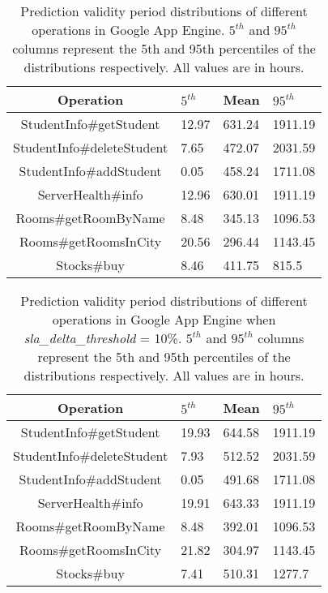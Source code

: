 \begin{table}
\begin{center}
\begin{tabular}{|c|p{1cm}|p{1cm}|p{1cm}|}
\hline
Operation & $5^{th}$ & Mean & $95^{th}$ \\ \hline
StudentInfo\#getStudent & 12.97 & 631.24 & 1911.19 \\ \hline
StudentInfo\#deleteStudent & 7.65 & 472.07 & 2031.59 \\ \hline
StudentInfo\#addStudent & 0.05 & 458.24 & 1711.08 \\ \hline
ServerHealth\#info & 12.96 & 630.01 & 1911.19 \\ \hline
Rooms\#getRoomByName & 8.48 & 345.13 & 1096.53 \\ \hline
Rooms\#getRoomsInCity & 20.56 & 296.44 & 1143.45 \\ \hline
Stocks\#buy & 8.46 & 411.75 & 815.5 \\ \hline
\end{tabular}
\end{center}
\caption{Prediction validity period distributions of different operations in
Google App Engine. $5^{th}$ and $95^{th}$ 
columns represent the 5th and 95th percentiles of the
distributions respectively. All values are in hours.
\label{tab:validity_periods}
}
\end{table}

\begin{table}
\begin{center}
\begin{tabular}{|c|p{1cm}|p{1cm}|p{1cm}|}
\hline
Operation & $5^{th}$ & Mean & $95^{th}$ \\ \hline
StudentInfo\#getStudent & 19.93 & 644.58 & 1911.19 \\ \hline
StudentInfo\#deleteStudent & 7.93 & 512.52 & 2031.59 \\ \hline
StudentInfo\#addStudent & 0.05 & 491.68 & 1711.08 \\ \hline
ServerHealth\#info & 19.91 & 643.33 & 1911.19 \\ \hline
Rooms\#getRoomByName & 8.48 & 392.01 & 1096.53 \\ \hline
Rooms\#getRoomsInCity & 21.82 & 304.97 & 1143.45 \\ \hline
Stocks\#buy & 7.41 & 510.31 & 1277.7 \\ \hline
\end{tabular}
\end{center}
\caption{Prediction validity period distributions of different operations in
Google App Engine when \textit{sla\_delta\_threshold} = 10\%. $5^{th}$ and $95^{th}$ 
columns represent the 5th and 95th percentiles of the
distributions respectively. All values are in hours.
\label{tab:validity_periods_sd10}
}
\end{table}

